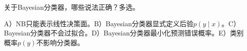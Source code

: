 关于Bayesian分类器，哪些说法正确？多选。


A）NB只能表示线性决策面。B）Bayesian分类器显式定义后验\(p(y\mid x)\)。C）Bayesian分类器不会过拟合。D）Bayesian分类器最小化预测错误概率。E）类别概率\(p(y)\)不影响分类器。
